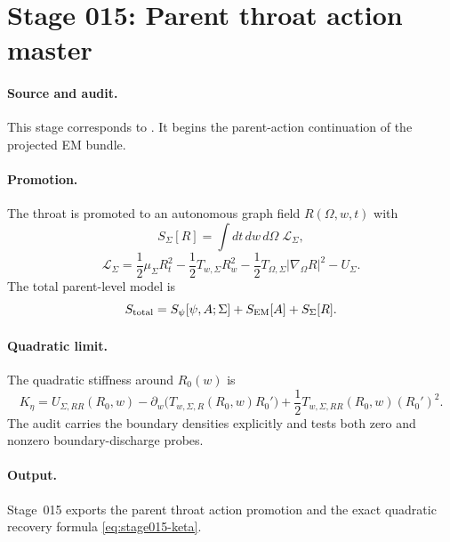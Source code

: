 \section[Stage 015]{Stage 015: Parent throat action master}
\label{stage:015}


\paragraph{Source and audit.}
This stage corresponds to
.
It begins the parent-action continuation of the projected EM bundle.

\paragraph{Promotion.}
The throat is promoted to an autonomous graph field \(R(\Omega,w,t)\) with
\begin{equation}
\label{eq:stage008-parent-action}
S_\Sigma[R]=\int dt\,dw\,d\Omega\;\mathcal L_\Sigma,
\end{equation}
\begin{equation}
\label{eq:stage015-parent-density}
\mathcal L_\Sigma
=\frac12\mu_\Sigma R_t^2
-\frac12T_{w,\Sigma}R_w^2
-\frac12T_{\Omega,\Sigma}|\nabla_\Omega R|^2
-U_\Sigma .
\end{equation}
The total parent-level model is
\begin{equation}
\label{eq:stage015-total-action}
S_{\rm total}=S_\psi[\psi,A;\Sigma]+S_{\rm EM}[A]+S_\Sigma[R].
\end{equation}

\paragraph{Quadratic limit.}
The quadratic stiffness around \(R_0(w)\) is
\begin{equation}
\label{eq:stage015-keta}
K_\eta=
U_{\Sigma,RR}(R_0,w)
-\partial_w\!\bigl(T_{w,\Sigma,R}(R_0,w)R_0'\bigr)
+\frac12T_{w,\Sigma,RR}(R_0,w)(R_0')^2.
\end{equation}
The audit carries the boundary densities explicitly and tests both zero and
nonzero boundary-discharge probes.

\paragraph{Output.}
Stage~015 exports the parent throat action promotion and the exact
quadratic recovery formula \eqref{eq:stage015-keta}.
